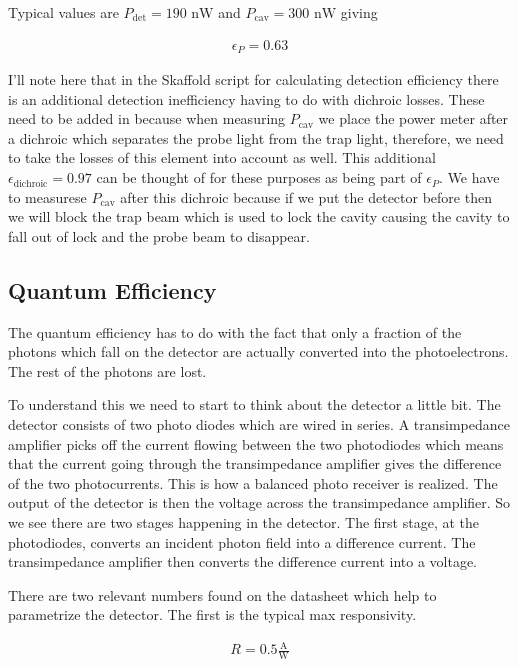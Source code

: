 \documentclass[12pt]{article}
\begin{document}
Typical values are $P_{\text{det}} = 190 \text{ nW}$ and $P_{\text{cav}} = 300 \text{ nW}$ giving

\begin{align}
\epsilon_P = 0.63
\end{align}

I'll note here that in the Skaffold script for calculating detection efficiency there is an additional detection inefficiency having to do with dichroic losses. These need to be added in because when measuring $P_{\text{cav}}$ we place the power meter after a dichroic which separates the probe light from the trap light, therefore, we need to take the losses of this element into account as well. This additional $\epsilon_{\text{dichroic}} = 0.97$ can be thought of for these purposes as being part of $\epsilon_P$. We have to measurese $P_{\text{cav}}$ after this dichroic because if we put the detector before then we will block the trap beam which is used to lock the cavity causing the cavity to fall out of lock and the probe beam to disappear.

\subsection{Quantum Efficiency}

The quantum efficiency has to do with the fact that only a fraction of the photons which fall on the detector are actually converted into the photoelectrons. The rest of the photons are lost. 

To understand this we need to start to think about the detector a little bit. The detector consists of two photo diodes which are wired in series. A transimpedance amplifier picks off the current flowing between the two photodiodes which means that the current going through the transimpedance amplifier gives the difference of the two photocurrents. This is how a balanced photo receiver is realized. The output of the detector is then the voltage across the transimpedance amplifier. So we see there are two stages happening in the detector. The first stage, at the photodiodes, converts an incident photon field into a difference current. The transimpedance amplifier then converts the difference current into a voltage.

There are two relevant numbers found on the datasheet which help to parametrize the detector. The first is the typical max responsivity.

\begin{align}
R = 0.5 \frac{\text{A}}{\text{W}}
\end{align}
\end{document}
